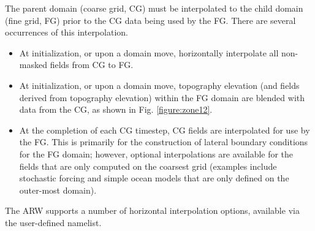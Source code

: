 The parent domain (coarse grid, CG) must be interpolated to the child domain 
(fine grid, FG) prior to the CG data being used by the FG. There are several 
occurrences of this interpolation.
\begin{itemize}\setlength{\parskip}{-4pt}
\item At initialization, or upon a domain move, horizontally interpolate all 
non-masked fields from CG to FG.
\item At initialization, or upon a domain move, topography elevation (and 
fields derived from topography elevation) within the FG domain are blended 
with data from the CG, as shown in Fig. \ref{figure:zone12}.
\item At the completion of each CG timestep, CG fields are interpolated
for use by the FG. This is primarily for the construction of lateral boundary 
conditions for the FG domain; however, optional interpolations are available for the fields that are 
only computed on the coarsest grid (examples include stochastic forcing and 
simple ocean models that are only defined on the outer-most domain).
\end{itemize}
\noindent 
The ARW supports a number of horizontal interpolation options, available via
the user-defined namelist.
